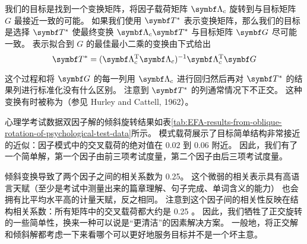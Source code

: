 我们的目标是找到一个变换矩阵，将因子载荷矩阵 $ \vLambda_c $ 旋转到与目标矩阵 $ G $ 最接近一致的可能。
如果我们使用 $ \vT^* $ 表示变换矩阵，那么我们的目标是选择 $ \vT^* $
使最终变换 $ \vLambda_c\vT^* $ 与目标矩阵 $ \vG $ 尽可能一致。
表示拟合到 $G$ 的最佳最小二乘的变换由下式给出
\begin{equation}
    \vT^* = (\vLambda_c\T\vLambda_c)^{-1} \vLambda_c\T\vG
\end{equation}

这个过程和将 $ \vG $ 的每一列用 $ \vLambda_c $ 进行回归然后再对 $ \vT^* $ 的结果列进行标准化没有什么区别。
注意到 $ \vT^* $ 的列通常情况下不正交。
这种变换有时被称为（参见 Hurley and Cattell, 1962）。

心理学考试数据双因子解的倾斜旋转结果如表\ref{tab:EFA-results-from-oblique-rotation-of-psychological-test-data}所示。
模式载荷展示了目标简单结构非常接近的近似：因子模式中的交叉载荷的绝对值在 $ 0.02 $ 到 $ 0.06 $ 附近。
因此，我们有了一个简单解，第一个因子由前三项考试度量，第二个因子由后三项考试度量。

\begin{table}[t]
\end{table}

倾斜变换导致了两个因子之间的相关系数为 0.25。
这个微弱的相关表示具有高语言天赋（至少是考试中测量出来的篇章理解、句子完成、单词含义的能力）
也会拥有比平均水平高的计量天赋，反之相同。
注意到这个因子间的相关性反映在结构相关系数：所有矩阵中的交叉载荷都大约是 0.25 。
因此，我们牺牲了正交旋转的一些简单性，换来一种可以说是“更清洁”的因素解决方案。
一般地，将正交解和倾斜解都考虑一下来看哪个可以更好地服务目标并不是一个坏主意。

